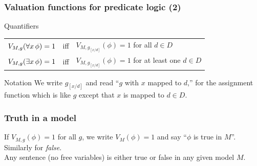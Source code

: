 \documentclass[fleqn,10pt,serif,xcolor=svgnames,xcolor=table,aspectratio=169,handout]{beamer}
\begin{document}
\begin{frame}
  \frametitle{Valuation functions for predicate logic (2)}

  \begin{block}{Quantifiers}
    \begin{tabular}{lcl}
      $V_{M,g}(\forall x \thinspace \phi) = 1$ & iff & $V_{M,g_{[x/d]}}(\phi) = 1$ for all $d \in D$\\
      $V_{M,g}(\exists x \thinspace \phi) = 1$ & iff & $V_{M,g_{[x/d]}}(\phi) = 1$ for at least one $d \in D$
    \end{tabular}
  \end{block}


  \begin{block}{Notation}
    We write $g_{[x/d]}$ and read ``$g$ with $x$ mapped to $d$,'' for the assignment function
    which is like $g$ except that $x$ is mapped to $d \in D$.
  \end{block}

\end{frame}


\begin{frame}
  \frametitle{Truth in a model}

    If $V_{M,g}(\phi) = 1$ for all $g$, we write $V_{M}(\phi) = 1$ and say ``$\phi$ is true in
    $M$''. \\
    Similarly for \textit{false}. \\
    Any sentence (no free variables) is either true or false in any given model $M$.

\end{frame}
\end{document}
